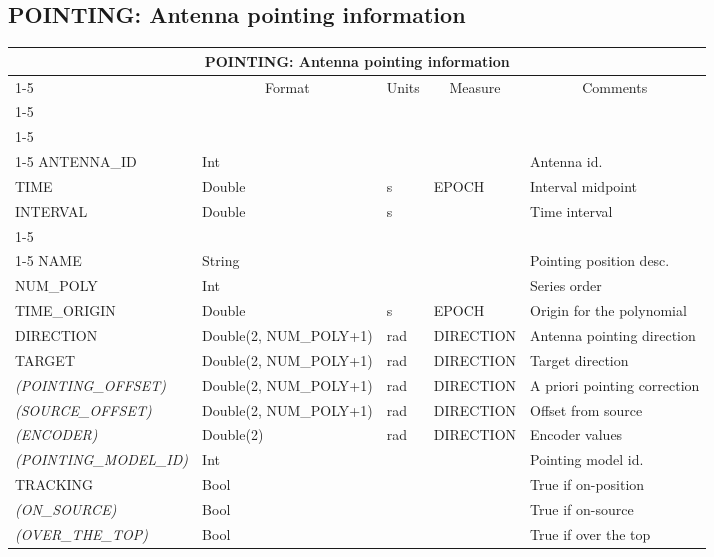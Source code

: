 \documentclass{article}
\newcommand{\defline}[1]{\cline{1-5}
\multicolumn{5}{|l|}{#1} \\
\cline{1-5}}
\newcommand{\definetable}[2]
{
	\vfill\newpage
	\subsection{#1}
        \vspace{0.15in}
        \small
	\begin{tabular}{|l|p{1.25in}|l|p{.9in}|p{1.4in}|}
	\hline
	\multicolumn{5}{|c|}{\bf #1}\\ 
	\cline{1-5}
        \multicolumn{1}{|c|}{Name}&\multicolumn{1}{|c|}{Format}&
        \multicolumn{1}{|c|}{Units}&\multicolumn{1}{|c|}{Measure}&
        \multicolumn{1}{|c|}{Comments}\\
        \cline{1-5}
        #2
        \hline
	\end{tabular}
}
\begin{document}
\definetable{POINTING: Antenna pointing information}{
\defline{\bf Columns}
\defline{\em Key}
ANTENNA\_ID  &  Int & & & Antenna id.\\
TIME         &  Double & s & EPOCH & Interval midpoint\\
INTERVAL     &  Double & s &       & Time interval\\
\defline{\em Data}
NAME     &   String & & & Pointing position desc.\\
NUM\_POLY & Int & & & Series order \\
TIME\_ORIGIN & Double & s & EPOCH & Origin for the polynomial\\
DIRECTION & Double(2, NUM\_POLY+1) & rad & DIRECTION & 
  Antenna pointing direction\\
TARGET & Double(2, NUM\_POLY+1) & rad & DIRECTION & Target direction \\
{\it (POINTING\_OFFSET)} & Double(2, NUM\_POLY+1) & rad & DIRECTION &
  A priori pointing correction \\
{\it (SOURCE\_OFFSET)} & Double(2, NUM\_POLY+1) & rad & DIRECTION & Offset from source\\
{\it (ENCODER)} & Double(2) & rad & DIRECTION & Encoder values\\
{\it (POINTING\_MODEL\_ID)} & Int & & & Pointing model id. \\
TRACKING & Bool & & & True if on-position \\
{\it(ON\_SOURCE)} & Bool & & & True if on-source\\
{\it(OVER\_THE\_TOP)} & Bool & & & True if over the top\\
}
\end{document}

